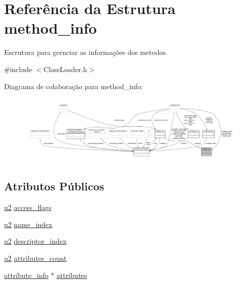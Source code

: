 \hypertarget{structmethod__info}{}\section{Referência da Estrutura method\+\_\+info}
\label{structmethod__info}


Escrutura para gernciar as informações dos metodos.  




{\ttfamily \#include $<$Class\+Loader.\+h$>$}



Diagrama de colaboração para method\+\_\+info\+:
\nopagebreak
\begin{figure}[H]
\begin{center}
\leavevmode
\includegraphics[width=350pt]{structmethod__info__coll__graph}
\end{center}
\end{figure}
\subsection*{Atributos Públicos}
\begin{DoxyCompactItemize}
\item 
\hyperlink{ClassLoader_8h_a5f223212eef04d10a4550ded680cb1cf}{u2} \hyperlink{structmethod__info_a3b657027a141cdbc94ded28607c98be5}{access\+\_\+flags}
\item 
\hyperlink{ClassLoader_8h_a5f223212eef04d10a4550ded680cb1cf}{u2} \hyperlink{structmethod__info_ab91d62d0658b77bba83f6bb685e3bbb9}{name\+\_\+index}
\item 
\hyperlink{ClassLoader_8h_a5f223212eef04d10a4550ded680cb1cf}{u2} \hyperlink{structmethod__info_a7713103e0c8d060630ad62774fb9be37}{descriptor\+\_\+index}
\item 
\hyperlink{ClassLoader_8h_a5f223212eef04d10a4550ded680cb1cf}{u2} \hyperlink{structmethod__info_ad9e5e1e2fc850806addadd6deab8565d}{attributes\+\_\+count}
\item 
\hyperlink{structattribute__info}{attribute\+\_\+info} $\ast$ \hyperlink{structmethod__info_a8ce4caaa03680c91f548558a38647ad8}{attributes}
\end{DoxyCompactItemize}


